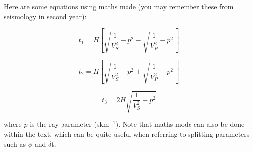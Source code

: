 Here are some equations using maths mode (you may remember these from seismology in second year):

\begin{equation}
t_{1}= H\left[{\sqrt{\frac{1}{V_{S}^{2}}-p^{2}} - \sqrt{\frac{1}{V_{P}^{2}}-p^{2}}} \,\right]
\label{RFStravelT1}
\end{equation}

\begin{equation}
t_{2}=H\left[{\sqrt{\frac{1}{V_{S}^{2}}-p^{2}} + \sqrt{\frac{1}{V_{P}^{2}}-p^{2}}}\,\right]
\label{RFStravelT2}
\end{equation}

\begin{equation}
t_{3}=2H\sqrt{\frac{1}{V_{S}^{2}}-p^{2}}
\label{RFStravelT3}
\end{equation}

where $p$ is the ray parameter (skm$^{-1}$).  Note that maths mode can also be done within the text, which can be quite useful when referring to splitting parameters such as $\phi$ and $\delta$t.






